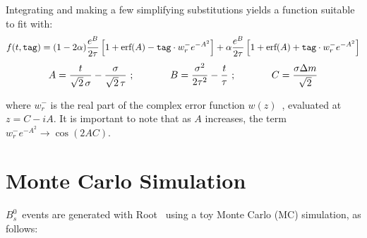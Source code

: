 \documentclass{article}
\newcommand{\Bs}{\mbox{$B_{s}^{0}$}}
\newcommand{\Tag}{\mbox{\tt tag}}
\newcommand{\erf}{\mbox{erf}}
\begin{document}
Integrating and making a few simplifying substitutions yields a function suitable to fit with:
\begin{equation}
\label{fitfunc}
	f(t,\Tag) = (1-2\alpha)\frac{e^B}{2\tau}\left[1+\erf(A)-\mbox{\tt tag}\cdot w_r^-e^{-A^2}\right] 
		+ \alpha\frac{e^B}{2\tau}\left[1+\erf(A)+\mbox{\tt tag}\cdot w_r^-e^{-A^2}\right]
\end{equation}
\[	 
	A=\frac{t}{\sqrt{2}\,\sigma}-\frac{\sigma}{\sqrt{2}\,\tau}\,\,; \mbox{\hspace{0.5in}} 
	B=\frac{\sigma^2}{2\tau^2}-\frac{t}{\tau}\,\,; \mbox{\hspace{0.5in}} 
	C=\frac{\sigma \Delta m}{\sqrt{2}}
\]

\noindent where $w_r^-$ is the real part of the complex error function $w(z)$~\cite{cwerf}, evaluated at $z = C - iA$. It is important to note that as $A$ increases, the term $w_r^-e^{-A^2} \rightarrow \cos(2AC)$.\\

\section{Monte Carlo Simulation}

\Bs\ events are generated with Root~\cite{root} using a toy Monte Carlo (MC) simulation, as follows:
\end{document}
